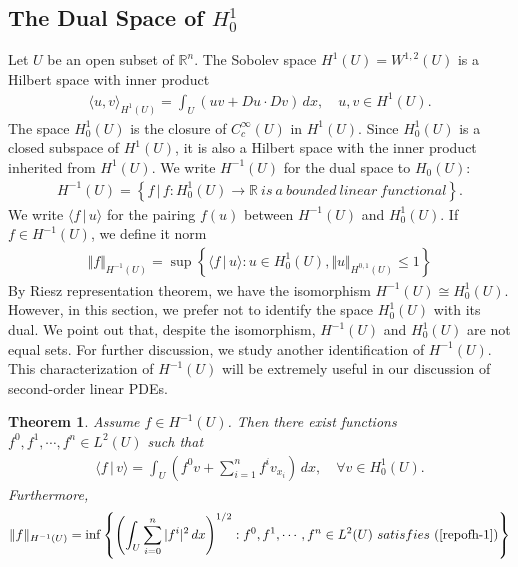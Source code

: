 \documentclass{article}
\numberwithin{equation}{section}
\newcommand{\bbR}{\mathbb{R}}
\theoremstyle{plain}
\newtheorem{theorem}{Theorem}[section]
\theoremstyle{definition}
\begin{document}
\subsection{The Dual Space of $H_0^1$}
Let $U$ be an open subset of $\bbR^n$. The Sobolev space $H^1(U)=W^{1,2}(U)$ is a Hilbert space with inner product
\begin{align*}
	\langle u,v\rangle_{H^1(U)}=\int_U (uv+Du\cdot Dv)\,dx,\quad u,v\in H^1(U).
\end{align*}
The space $H_0^1(U)$ is the closure of $C_c^\infty(U)$ in $H^1(U)$. Since $H_0^1(U)$ is a closed subspace of $H^1(U)$, it is also a Hilbert space with the inner product inherited from $H^1(U)$. We write $H^{-1}(U)$ for the dual space to $H_0(U)$:
\begin{align*}
	H^{-1}(U)=\left\{f\,|\,f:H_0^1(U)\to\bbR\ is\ a\ bounded\ linear\ functional\right\}.
\end{align*}
We write $\langle f\,|\,u\rangle$ for the pairing $f(u)$ between $H^{-1}(U)$ and $H_0^1(U)$. If $f\in H^{-1}(U)$, we define it norm
\begin{align*}
	\Vert f\Vert_{H^{-1}(U)}=\sup\left\{\langle f\,|\,u\rangle:u\in H_0^1(U),\Vert u\Vert_{H^{0,1}(U)}\leq 1\right\}
\end{align*}
By Riesz representation theorem, we have the isomorphism $H^{-1}(U)\cong H_0^1(U)$. However, in this section, we prefer not to identify the space $H_0^1(U)$ with its dual. We point out that, despite the isomorphism, $H^{-1}(U)$ and $H_0^1(U)$ are not equal sets. For further discussion, we study another identification of $H^{-1}(U)$. This characterization of $H^{-1}(U)$ will be extremely useful in our discussion of second-order linear PDEs.
\begin{theorem}
Assume $f\in H^{-1}(U)$. Then there exist functions $f^0,f^1,\cdots,f^n\in L^2(U)$ such that
\begin{align}
	\langle f\,|\,v\rangle=\int_U\left(f^0v+\sum_{i=1}^n f^i v_{x_i}\right)\,dx,\quad\forall v\in H_0^1(U).\label{repofh-1}
\end{align}
Furthermore,
\begin{align}
	\Vert f\Vert_{H^{-1}(U)}=\inf\left\{\left(\int_U\sum_{i=0}^n\vert f^i\vert^2\,dx\right)^{1/2}: f^0,f^1,\cdots,f^n\in L^2(U)\ satisfies\ (\ref{repofh-1})\right\}\label{normestimateofh-1}
\end{align}
\end{theorem}
\end{document}
